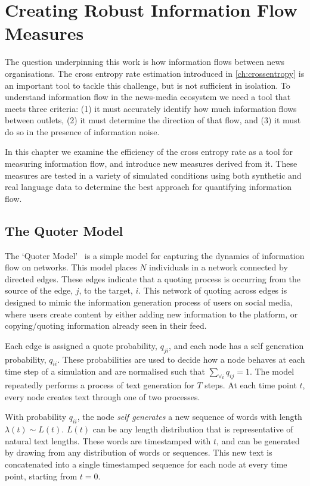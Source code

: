 \chapter{Creating Robust Information Flow Measures}\label{ch:quotermodel}

The question underpinning this work is how information flows between news organisations. The cross entropy rate estimation introduced in \autoref{ch:crossentropy} is an important tool to tackle this challenge, but is not sufficient in isolation. To understand information flow in the news-media ecosystem we need a tool that meets three criteria: (1) it must accurately identify how much information flows between outlets, (2) it must determine the direction of that flow, and (3) it must do so in the presence of information noise.

In this chapter we examine the efficiency of the cross entropy rate as a tool for measuring information flow, and introduce new measures derived from it. These measures are tested in a variety of simulated conditions using both synthetic and real language data to determine the best approach for quantifying information flow.


\section{The Quoter Model}
The `Quoter Model'~\cite{bagrow_quoter_2018} is a simple model for capturing the dynamics of information flow on networks. This model places $N$ individuals in a network connected by directed edges. These edges indicate that a quoting process is occurring from the source of the edge, $j$, to the target, $i$. This network of quoting across edges is designed to mimic the information generation process of users on social media, where users create content by either adding new information to the platform, or copying/quoting information already seen in their feed.

Each edge is assigned a quote probability, $q_{ji}$, and each node has a self generation probability, $q_{ii}$. These probabilities are used to decide how a node behaves at each time step of a simulation and are normalised such that $\sum_{\forall i} q_{ij} = 1$. The model repeatedly performs a process of text generation for $T$ steps. At each time point $t$, every node creates text through one of two processes.

With probability $q_{ii}$, the node \emph{self generates} a new sequence of words with length $\lambda(t) \sim L(t)$. $L(t)$ can be any length distribution that is representative of natural text lengths. These words are timestamped with $t$, and can be generated by drawing from any distribution of words or sequences. This new text is concatenated into a single timestamped sequence for each node at every time point, starting from $t=0$.

